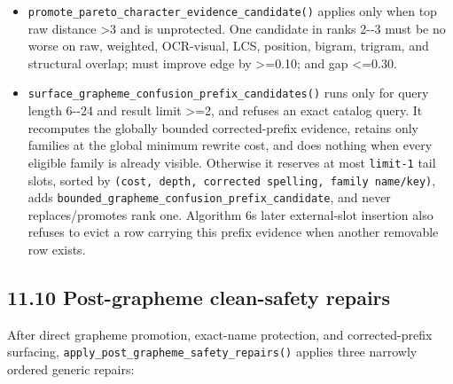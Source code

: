 \begin{itemize}
\item
  \texttt{promote\_\allowbreak{}pareto\_\allowbreak{}character\_\allowbreak{}evidence\_\allowbreak{}candidate()} applies only when top raw distance \textgreater3 and is unprotected. One candidate in ranks 2-\/-3 must be no worse on raw, weighted, OCR-visual, LCS, position, bigram, trigram, and structural overlap; must improve edge by \textgreater=0.10; and gap \textless=0.30.
\item
  \texttt{surface\_\allowbreak{}grapheme\_\allowbreak{}confusion\_\allowbreak{}prefix\_\allowbreak{}candidates()} runs only for query length 6-\/-24 and result limit \textgreater=2, and refuses an exact catalog query. It recomputes the globally bounded corrected-prefix evidence, retains only families at the global minimum rewrite cost, and does nothing when every eligible family is already visible. Otherwise it reserves at most \texttt{limit-1} tail slots, sorted by \texttt{(cost,\ depth,\ corrected\ spelling,\ family\ name/key)}, adds \texttt{bounded\_\allowbreak{}grapheme\_\allowbreak{}confusion\_\allowbreak{}prefix\_\allowbreak{}candidate}, and never replaces/promotes rank one. Algorithm 6\textquotesingle s later external-slot insertion also refuses to evict a row carrying this prefix evidence when another removable row exists.
\end{itemize}

\subsection{11.10 Post-grapheme clean-safety repairs}\label{1110-post-grapheme-clean-safety-repairs}

After direct grapheme promotion, exact-name protection, and corrected-prefix surfacing, \texttt{apply\_\allowbreak{}post\_\allowbreak{}grapheme\_\allowbreak{}safety\_\allowbreak{}repairs()} applies three narrowly ordered generic repairs:

